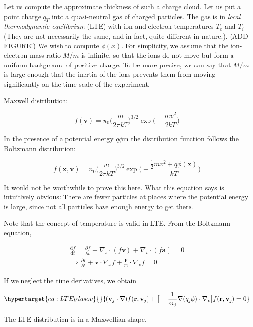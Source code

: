 \documentclass[
  notoc %
]{tufte-book}
\begin{document}
Let us compute the approximate thickness of such a charge cloud. Let us
put a point charge \(q_T\) into a quasi-neutral gas of charged
particles. The gas is in \emph{local thermodynamic equilibrium} (LTE)
with ion and electron temperatures \(T_e\) and \(T_i\) (They are not
necessarily the same, and in fact, quite different in nature.). (ADD
FIGURE!) We wish to compute \(\phi(x)\). For simplicity, we assume that
the ion-electron mass ratio \(M/m\) is infinite, so that the ions do not
move but form a uniform background of positive charge. To be more
precise, we can say that \(M/m\) is large enough that the inertia of the
ions prevents them from moving significantly on the time scale of the
experiment.

Maxwell distribution:

\[
f(\mathbf{v})=n_0\Big( \frac{m}{2\pi kT}\Big)^{3/2}\exp\Big( -\frac{mv^2}{2kT}\Big)
\]

In the presence of a potential energy \(q\phi\)m the distribution
function follows the Boltzmann distribution:

\[
f(\mathbf{x},\mathbf{v})=n_0\Big( \frac{m}{2\pi kT}\Big)^{3/2}\exp\Big( -\frac{\frac{1}{2}mv^2+q\phi(\mathbf{x})}{kT}\Big)
\]

It would not be worthwhile to prove this here. What this equation says
is intuitively obvious: There are fewer particles at places where the
potential energy is large, since not all particles have enough energy to
get there.

Note that the concept of temperature is valid in LTE. From the Boltzmann
equation,

\[
\begin{aligned}
\frac{\mathrm{d}f}{\mathrm{d}t}=\frac{\partial f}{\partial t}+\nabla_x\cdot(f\mathbf{v})+\nabla_v\cdot(f\mathbf{a})=0 \\
\Rightarrow \frac{\partial f}{\partial t}+\mathbf{v}\cdot\nabla_x f+\frac{\mathbf{F}}{m}\cdot\nabla_v f=0
\end{aligned}
\]

If we neglect the time derivatives, we obtain

\begin{equation}\protect\hypertarget{eq:LTE_Vlasov}{}{
(\mathbf{v}_j\cdot\nabla)f(\mathbf{r},\mathbf{v}_j)+\big[-\frac{1}{m_j}\nabla(q_j\phi)\cdot\nabla_v\big]f(\mathbf{r},\mathbf{v}_j)=0
}\label{eq:LTE_Vlasov}\end{equation}

The LTE distribution is in a Maxwellian shape,
\end{document}
